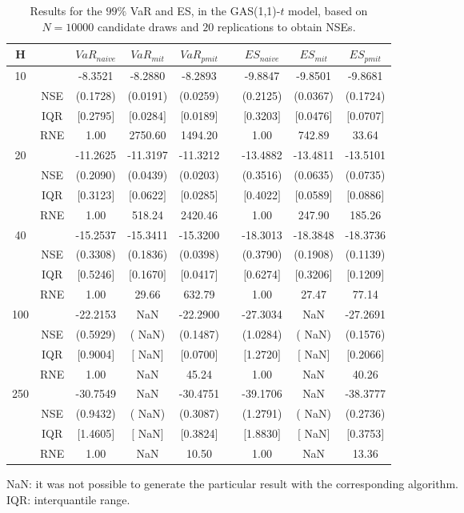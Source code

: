 \begin{table}[h] 
\centering 
\caption{Results for the $99\%$ VaR and ES, in the GAS(1,1)-$t$ model, based on $N=10000$ candidate draws and $20$ replications to obtain NSEs.} 
\label{tab:res_algos_t_gas_ML} 
\begin{tabular}{ccccccccc}  
 H & & $VaR_{naive}$ & $VaR_{mit}$ & $VaR_{pmit}$ &  & $ES_{naive}$ & $ES_{mit}$ & $ES_{pmit}$ \\ \hline 
10 & & -8.3521 & -8.2880 & -8.2893 & & -9.8847 & -9.8501 & -9.8681  \\ 
  & NSE & (0.1728) & (0.0191) & (0.0259) & & (0.2125) & (0.0367) & (0.1724)   \\ 
 & IQR & $[$0.2795$]$ & $[$0.0284$]$ & $[$0.0189$]$ & & $[$0.3203$]$ & $[$0.0476$]$ & $[$0.0707$]$  \\  
  & RNE &   1.00 & 2750.60 & 1494.20 & &   1.00 & 742.89 &  33.64   \\ [1ex] 
20 & & -11.2625 & -11.3197 & -11.3212 & & -13.4882 & -13.4811 & -13.5101  \\ 
  & NSE & (0.2090) & (0.0439) & (0.0203) & & (0.3516) & (0.0635) & (0.0735)   \\ 
 & IQR & $[$0.3123$]$ & $[$0.0622$]$ & $[$0.0285$]$ & & $[$0.4022$]$ & $[$0.0589$]$ & $[$0.0886$]$  \\  
  & RNE &   1.00 & 518.24 & 2420.46 & &   1.00 & 247.90 & 185.26   \\ [1ex] 
40 & & -15.2537 & -15.3411 & -15.3200 & & -18.3013 & -18.3848 & -18.3736  \\ 
  & NSE & (0.3308) & (0.1836) & (0.0398) & & (0.3790) & (0.1908) & (0.1139)   \\ 
 & IQR & $[$0.5246$]$ & $[$0.1670$]$ & $[$0.0417$]$ & & $[$0.6274$]$ & $[$0.3206$]$ & $[$0.1209$]$  \\  
  & RNE &   1.00 &  29.66 & 632.79 & &   1.00 &  27.47 &  77.14   \\ [1ex] 
100 & & -22.2153 &    NaN & -22.2900 & & -27.3034 &    NaN & -27.2691  \\ 
  & NSE & (0.5929) & (   NaN) & (0.1487) & & (1.0284) & (   NaN) & (0.1576)   \\ 
 & IQR & $[$0.9004$]$ & $[$   NaN$]$ & $[$0.0700$]$ & & $[$1.2720$]$ & $[$   NaN$]$ & $[$0.2066$]$  \\  
  & RNE &   1.00 &    NaN &  45.24 & &   1.00 &    NaN &  40.26   \\ [1ex] 
250 & & -30.7549 &    NaN & -30.4751 & & -39.1706 &    NaN & -38.3777  \\ 
  & NSE & (0.9432) & (   NaN) & (0.3087) & & (1.2791) & (   NaN) & (0.2736)   \\ 
 & IQR & $[$1.4605$]$ & $[$   NaN$]$ & $[$0.3824$]$ & & $[$1.8830$]$ & $[$   NaN$]$ & $[$0.3753$]$  \\  
  & RNE &   1.00 &    NaN &  10.50 & &   1.00 &    NaN &  13.36   \\ [1ex] 
\hline 
\end{tabular} 
\raggedright 

\vspace{5pt}\footnotesize{NaN: it was not possible to generate the particular result with the corresponding algorithm.} \\ 
\vspace{5pt}\footnotesize{IQR: interquantile range.} 
\end{table} 

